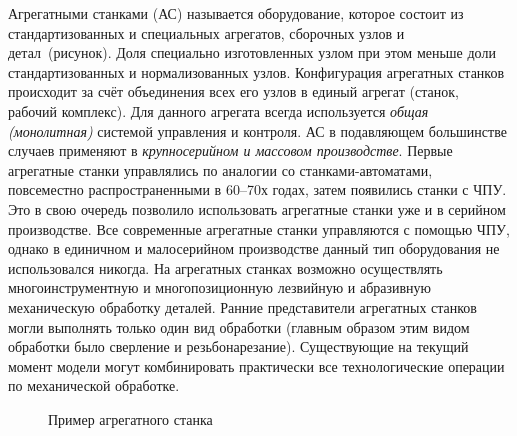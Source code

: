 Агрегатными станками (АС) называется оборудование, которое состоит из стандартизованных и специальных агрегатов, сборочных узлов и детал~(рисунок). Доля специально изготовленных узлом при этом меньше доли стандартизованных и нормализованных узлов. Конфигурация агрегатных станков происходит за счёт объединения всех его узлов в единый агрегат (станок, рабочий комплекс). Для данного агрегата всегда используется \textit{общая (монолитная)} системой управления и контроля. АС в подавляющем большинстве случаев применяют в \textit{крупносерийном и массовом производстве}. Первые агрегатные станки управлялись по аналогии со станками-автоматами, повсеместно распространенными в 60--70х годах, затем появились станки с ЧПУ. Это в свою очередь позволило использовать агрегатные станки уже и в серийном производстве. Все современные агрегатные станки управляются с помощью ЧПУ, однако в единичном и малосерийном производстве данный тип оборудования не использовался никогда. На агрегатных станках возможно осуществлять многоинструментную и многопозиционную лезвийную и абразивную механическую обработку деталей. Ранние представители агрегатных станков могли выполнять только один вид обработки (главным образом этим видом обработки было сверление и резьбонарезание). Существующие на текущий момент модели могут комбинировать практически все технологические операции по механической обработке.

\begin{figure}[ht]
	\caption{Пример агрегатного станка}\label{fig:agr-example}
\end{figure}

